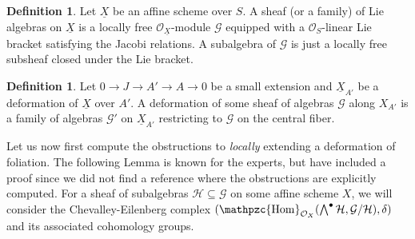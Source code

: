 \documentclass[reqno]{amsart}
\newcommand{\OO}{\mathcal{O}}
\DeclareMathOperator{\sHom}{\mathpzc{Hom}}
\theoremstyle{definition}
\newtheorem{definition}[theorem]{Definition}
\theoremstyle{named}
\begin{document}
\begin{definition}
    Let $\underline{X}$ be an affine scheme over $S$. A sheaf (or a family) of Lie algebras on $\underline{X}$ is a locally free $\OO_{\underline{X}}$-module $\mathcal G $ equipped with a $\OO_S$-linear Lie bracket satisfying the Jacobi relations. A subalgebra of $\mathcal G$ is just a locally free subsheaf closed under the Lie bracket.
\end{definition}

\begin{definition}
    Let $0\to J\to A'\to A\to 0$ be a small extension and $\underline{X}_{A'}$ be a deformation of $\underline{X}$ over $A'$. A deformation of some sheaf of algebras $\mathcal G$  along $X_{A'}$ is a family of algebras $\mathcal{G}'$ on $\underline{X}_{A'}$ restricting to $\mathcal G$ on the central fiber.
\end{definition}

Let us now first compute the obstructions to \emph{locally} extending a deformation of foliation. The  following Lemma is known for the experts, but have included a proof since we did not find a reference where the obstructions are explicitly computed. For a sheaf of subalgebras $\mathcal H\subseteq \mathcal G$ on some affine scheme $X$, we will consider the Chevalley-Eilenberg complex $ (\sHom_{\OO_X}(\bigwedge^\bullet \mathcal H,\mathcal G/\mathcal H),\delta)$ and its associated cohomology groups.
\end{document}
